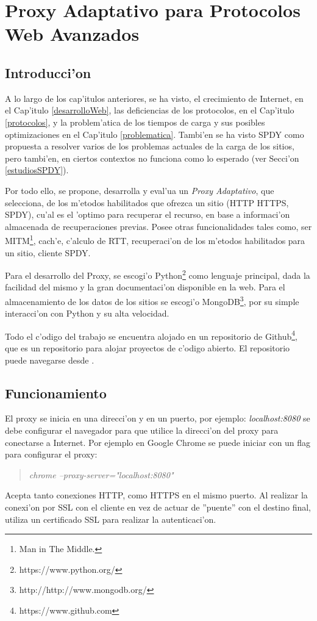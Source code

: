 \chapter{Proxy Adaptativo para Protocolos Web Avanzados}
\label{spdyproxypython}

\section{Introducci'on}

A lo largo de los cap'itulos anteriores, se ha visto, el crecimiento de Internet, en el Cap'itulo \ref{desarrolloWeb}, las deficiencias de los protocolos, en el Cap'itulo \ref{protocolos}, y la problem'atica de los tiempos de carga y sus posibles optimizaciones en el Cap'itulo \ref{problematica}. Tambi'en se ha visto SPDY como propuesta a resolver varios de los problemas actuales de la carga de los sitios, pero tambi'en, en ciertos contextos no funciona como lo esperado (ver Secci'on \ref{estudiosSPDY}).

Por todo ello, se propone, desarrolla y eval'ua un \textit{Proxy Adaptativo}, que selecciona, de los m'etodos habilitados que ofrezca un sitio (HTTP HTTPS, SPDY), cu'al es el 'optimo para recuperar el recurso, en base a informaci'on almacenada de recuperaciones previas. Posee otras funcionalidades tales como, ser MITM\footnote{Man in The Middle.}, cach'e, c'alculo de RTT, recuperaci'on de los m'etodos habilitados para un sitio, cliente SPDY.

Para el desarrollo del Proxy, se escogi'o Python\footnote{https://www.python.org/} como lenguaje principal, dada la facilidad del mismo y la gran documentaci'on disponible en la web. Para el almacenamiento de los datos de los sitios se escogi'o MongoDB\footnote{http://http://www.mongodb.org/}, por su simple interacci'on con Python y su alta velocidad.

Todo el c'odigo del trabajo se encuentra alojado en un repositorio de Github\footnote{https://www.github.com}, que es un repositorio para alojar proyectos de c'odigo abierto. El repositorio puede navegarse desde \citep{spdyproxypython}.

\section{Funcionamiento}

El proxy se inicia en una direcci'on y en un puerto, por ejemplo: \textit{localhost:8080} se debe configurar el navegador para que utilice la direcci'on del proxy para conectarse a Internet. Por ejemplo en Google Chrome se puede iniciar con un flag para configurar el proxy:
\begin{quote}
\textit{chrome --proxy-server="localhost:8080"}
\end{quote}
Acepta tanto conexiones HTTP, como HTTPS en el mismo puerto. Al realizar la conexi'on por SSL con el cliente en vez de actuar de ''puente'' con el destino final, utiliza un certificado SSL para realizar la autenticaci'on.

